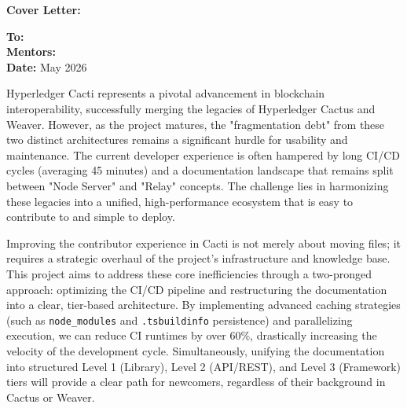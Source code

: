 

\vspace*{-1.5cm}

\AddToShipoutPictureBG*{%
    \color{lightgrayblue}
    \AtPageUpperLeft{\rule[-1.7in]{\paperwidth}{1.7in}}
}

\coverletterheader

\vspace{0.8cm}

\begin{center}
    {\color{primary}\LARGE \textbf{Cover Letter: \projecttitle}}
\end{center}

\vspace{0.5cm}

{\color{primary}\large \textbf{To:}} \committee \\
{\color{secondary}\large \textbf{Mentors:}} \mentors \\
{\color{primary}\large \textbf{Date:}} May 2026

\vspace{0.8cm}

Hyperledger Cacti represents a pivotal advancement in blockchain interoperability, successfully merging the legacies of Hyperledger Cactus and Weaver. However, as the project matures, the "fragmentation debt" from these two distinct architectures remains a significant hurdle for usability and maintenance. The current developer experience is often hampered by long CI/CD cycles (averaging 45 minutes) and a documentation landscape that remains split between "Node Server" and "Relay" concepts. The challenge lies in harmonizing these legacies into a unified, high-performance ecosystem that is easy to contribute to and simple to deploy.

Improving the contributor experience in Cacti is not merely about moving files; it requires a strategic overhaul of the project's infrastructure and knowledge base. This project aims to address these core inefficiencies through a two-pronged approach: optimizing the CI/CD pipeline and restructuring the documentation into a clear, tier-based architecture. By implementing advanced caching strategies (such as \texttt{node\_modules} and \texttt{.tsbuildinfo} persistence) and parallelizing execution, we can reduce CI runtimes by over 60\%, drastically increasing the velocity of the development cycle. Simultaneously, unifying the documentation into structured Level 1 (Library), Level 2 (API/REST), and Level 3 (Framework) tiers will provide a clear path for newcomers, regardless of their background in Cactus or Weaver.

